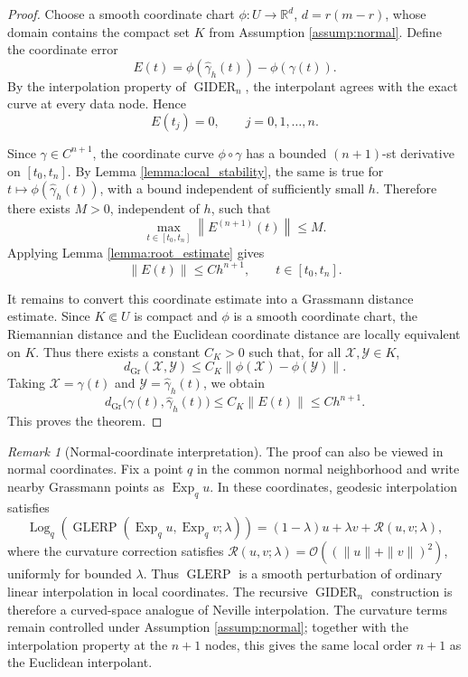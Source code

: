 \documentclass[a4paper,11pt]{article}
\newcommand{\bR}{\mathbb{R}}
\newcommand{\Log}{\operatorname{Log}}
\newcommand{\Exp}{\operatorname{Exp}}
\DeclareMathOperator{\Gr}{Gr}
\newcommand{\GLERP}{\operatorname{GLERP}}
\newcommand{\GIDER}{\operatorname{GIDER}}
\numberwithin{equation}{section}
\theoremstyle{plain}
\theoremstyle{definition}
\theoremstyle{remark}
\newtheorem{remark}[thm]{Remark}
\begin{document}
\begin{proof}
Choose a smooth coordinate chart \(\phi:U\to\bR^d\), \(d=r(m-r)\), whose domain contains the compact set \(K\) from Assumption \ref{assump:normal}.  Define the coordinate error
\[
    E(t)
    =
    \phi(\widehat{\gamma}_h(t))
    -
    \phi(\gamma(t)).
\]
By the interpolation property of \(\GIDER_n\), the interpolant agrees with the exact curve at every data node.  Hence
\[
    E(t_j)=0,
    \qquad j=0,1,\ldots,n.
\]

Since \(\gamma\in C^{n+1}\), the coordinate curve \(\phi\circ\gamma\) has a bounded \((n+1)\)-st derivative on \([t_0,t_n]\).  By Lemma \ref{lemma:local_stability}, the same is true for \(t\mapsto\phi(\widehat{\gamma}_h(t))\), with a bound independent of sufficiently small \(h\).  Therefore there exists \(M>0\), independent of \(h\), such that
\[
    \max_{t\in[t_0,t_n]}
    \left\|E^{(n+1)}(t)\right\|
    \le M.
\]
Applying Lemma \ref{lemma:root_estimate} gives
\[
    \|E(t)\|
    \le
    C h^{n+1},
    \qquad t\in[t_0,t_n].
\]

It remains to convert this coordinate estimate into a Grassmann distance estimate.  Since \(K\Subset U\) is compact and \(\phi\) is a smooth coordinate chart, the Riemannian distance and the Euclidean coordinate distance are locally equivalent on \(K\).  Thus there exists a constant \(C_K>0\) such that, for all \(\mathcal{X},\mathcal{Y}\in K\),
\[
    d_{\Gr}(\mathcal{X},\mathcal{Y})
    \le
    C_K
    \|\phi(\mathcal{X})-\phi(\mathcal{Y})\|.
\]
Taking \(\mathcal{X}=\gamma(t)\) and \(\mathcal{Y}=\widehat{\gamma}_h(t)\), we obtain
\[
    d_{\Gr}\bigl(\gamma(t),\widehat{\gamma}_h(t)\bigr)
    \le
    C_K\|E(t)\|
    \le
    C h^{n+1}.
\]
This proves the theorem.
\end{proof}

\begin{remark}[Normal-coordinate interpretation]\label{rem:normal_coordinate_interpretation}
The proof can also be viewed in normal coordinates.  Fix a point \(q\) in the common normal neighborhood and write nearby Grassmann points as \(\Exp_q u\).  In these coordinates, geodesic interpolation satisfies
\[
    \Log_q\left(
        \GLERP(\Exp_q u,\Exp_q v;\lambda)
    \right)
    =
    (1-\lambda)u+\lambda v+\mathcal{R}(u,v;\lambda),
\]
where the curvature correction satisfies \(\mathcal{R}(u,v;\lambda)=\mathcal{O}((\|u\|+\|v\|)^2)\), uniformly for bounded \(\lambda\).  Thus \(\GLERP\) is a smooth perturbation of ordinary linear interpolation in local coordinates.  The recursive \(\GIDER_n\) construction is therefore a curved-space analogue of Neville interpolation.  The curvature terms remain controlled under Assumption \ref{assump:normal}; together with the interpolation property at the \(n+1\) nodes, this gives the same local order \(n+1\) as the Euclidean interpolant.
\end{remark}
\end{document}
